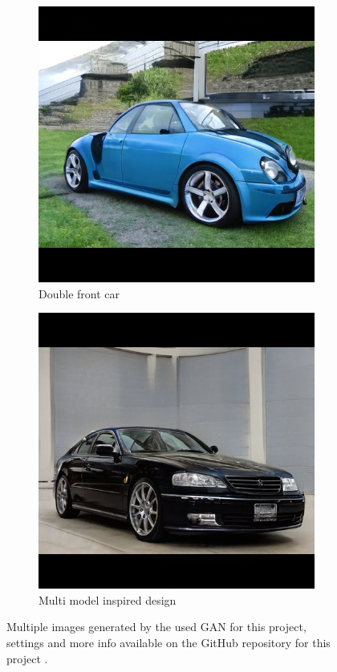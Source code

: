 \begin{figure}
\begin{subfigure}{.3\textwidth}
  \includegraphics[width=\textwidth]{images/Challenging angle (4).png}
  \caption{Double front car}
  \label{fig:doublefront}
\end{subfigure}
\hspace{.02\textwidth}
\begin{subfigure}{.3\textwidth}
  \centering
  \includegraphics[width=\textwidth]{images/Multi inspired car.png}
  \caption{Multi model inspired design}
  \label{fig:multiinspired}
\end{subfigure}
\captionsetup{width=.85\linewidth}
\caption{Multiple images generated by the used GAN for this project, settings and more info available on the GitHub repository for this project \citep{github_project}.}
\label{fig:straightexports}
\end{figure}

